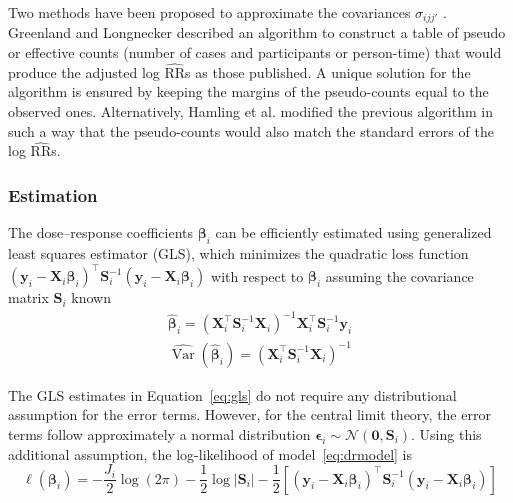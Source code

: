 \documentclass[11pt,a4paper,twoside,openany]{book}\usepackage{knitr}
\DeclareMathOperator{\Var}{Var}
\begin{document}
{{\noindent Two methods have been proposed to approximate the covariances $\sigma_{ijj'}$ \citep{greenland1992methods, hamling2008facilitating}. Greenland and Longnecker described an algorithm to construct a table of pseudo or effective counts (number of cases and participants or person-time) that would produce the adjusted log $\widehat{\mathrm{RR}}$s as those published. A unique solution for the algorithm is ensured by keeping the margins of the pseudo-counts equal to the observed ones. Alternatively, Hamling et al. modified the previous algorithm in such a way that the pseudo-counts would also match the standard errors of the log $\widehat{\mathrm{RR}}$s. 

\subsubsection*{Estimation}

The dose--response coefficients $\boldsymbol{\beta}_i$ can be efficiently estimated using generalized least squares estimator (GLS), which minimizes the quadratic loss function $\left(\mathbf{y}_i- \mathbf{X}_i \boldsymbol{\beta}_i \right)^\top \mathbf{S}_i^{-1} \left(\mathbf{y}_i- \mathbf{X}_i \boldsymbol{\beta}_i \right)$ with respect to $\boldsymbol{\beta}_i$ assuming the covariance matrix $\mathbf{S}_i$ known
\begin{equation}
\begin{gathered}
\boldsymbol{\hat \beta}_i = ( \mathbf{X}_i^\top  \mathbf{S}_i^{-1} \mathbf{X}_i)^{-1} \mathbf{X}_i^\top  \mathbf{S}_i^{-1} \mathbf{y}_i \\ 
\widehat{\Var} \left( \boldsymbol{\hat \beta}_i \right) = ( \mathbf{X}_i^\top \mathbf{S}_i^{-1} \mathbf{X}_i)^{-1}
\end{gathered}
\label{eq:gls}
\end{equation}

\noindent The GLS estimates in Equation~\ref{eq:gls} do not require any distributional assumption for the error terms. However, for the central limit theory, the error terms follow approximately a normal distribution $\boldsymbol{\epsilon}_i \sim \mathcal{N}\left(\mathbf{0}, \mathbf{S}_i \right)$. 
Using this additional assumption, the log-likelihood of model~\ref{eq:drmodel} is
\begin{equation}
\ell\left(\boldsymbol{\beta}_i\right) = -\frac{J_i}{2}\log\left(2\pi\right) - \frac{1}{2}\log|\mathbf{S}_i| - \frac{1}{2} \left[\left(\mathbf{y}_i- \mathbf{X}_i \boldsymbol{\beta}_i \right)^\top \mathbf{S}_i^{-1} \left(\mathbf{y}_i- \mathbf{X}_i \boldsymbol{\beta}_i \right) \right]
\label{eq:drmodel_logLik}
\end{equation}

}}
\end{document}
